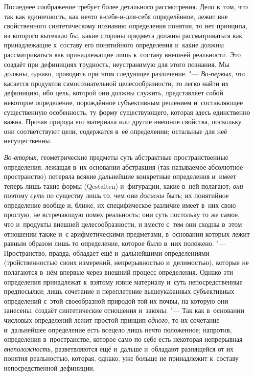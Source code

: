 Последнее соображение требует более детального рассмотрения.
Дело в~том, что так как единичность, как нечто
в-себе-и-для-себя определённое, лежит вне свойственного
синтетическому познанию определения понятия, то нет принципа, из которого
вытекало бы, какие стороны предмета должны рассматриваться как
принадлежащие к~составу его понятийного определения и~какие должны
рассматриваться как принадлежащие лишь к~составу внешней реальности. Это
создаёт при дефинициях трудность, неустранимую для этого познания. Мы
должны, однако, проводить при этом следующее различение. "---
{\em Во-первых,} что
касается продуктов самосознательной целесообразности, то легко найти их
дефиницию, ибо цель, которой они должны служить, представляет собой
некоторое определение, порождённое субъективным решением и~составляющее
существенную особенность, ту форму существующего, которая здесь единственно
важна. Прочая природа его материала или другие внешние свойства, поскольку
они соответствуют цели, содержатся в~её определении; остальные для неё
несущественны.

{\em Во-вторых,}
геометрические предметы суть абстрактные пространственные
определения; лежащая в~их основании абстракция (так называемое абсолютное
пространство) потеряла всякие дальнейшие конкретные определения и~имеет
теперь лишь такие формы (Qestalten) и~фигурации, какие в~ней
полагают; {\em они}
поэтому {\em суть}
по существу лишь то, чем они
{\em должны} быть; их
понятийное определение вообще и, ближе, их специфическое
различие имеет в~них свою простую, не встречающую помех реальность; они
суть постольку то же самое, что и~продукты внешней целесообразности, и
вместе с~тем они сходны в~этом отношении также и~с арифметическими
предметами, в~основании которых лежит равным образом лишь то определение,
которое было в~них положено. "--- Пространство, правда,
обладает ещё и~дальнейшими определениями (тройственностью своих измерений,
непрерывностью и~делимостью), которые не полагаются в~нём впервые через
внешний процесс определения. Однако эти определения принадлежат к~взятому
извне материалу и~суть непосредственные предпосылки; лишь сочетание и
переплетение вышеуказанных субъективных определений с~этой своеобразной
природой той их почвы, на которую они занесены, создаёт синтетические
отношения и~законы. "--- Так как в~основании числовых
определений лежит простой принцип
{\em одного,} то их
сочетание и~дальнейшее определение есть всецело лишь нечто положенное;
напротив, определения в~пространстве, которое само по себе есть некоторая
непрерывная {\em внеположность,}
разветвляются ещё и~дальше и~обладают разнящейся от их
понятия реальностью, которая, однако, уже больше не принадлежит к~составу
непосредственной дефиниции.

